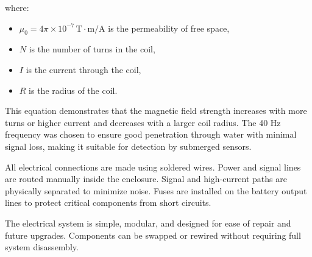 where:
\begin{itemize}
    \item \( \mu_0 = 4\pi \times 10^{-7} \, \text{T}\cdot\text{m/A} \) is the permeability of free space,
    \item \( N \) is the number of turns in the coil,
    \item \( I \) is the current through the coil,
    \item \( R \) is the radius of the coil.
\end{itemize}

This equation demonstrates that the magnetic field strength increases with more turns or higher current and decreases with a larger coil radius. The 40 Hz frequency was chosen to ensure good penetration through water with minimal signal loss, making it suitable for detection by submerged sensors.

All electrical connections are made using soldered wires. Power and signal lines are routed manually inside the enclosure. Signal and high-current paths are physically separated to minimize noise. Fuses are installed on the battery output lines to protect critical components from short circuits.

The electrical system is simple, modular, and designed for ease of repair and future upgrades. Components can be swapped or rewired without requiring full system disassembly.
